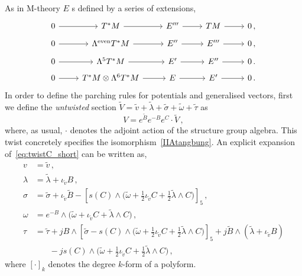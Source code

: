 \documentclass[debug]{phd}
\begin{document}
				As in M-theory $E$ s defined by a series of extensions,
							\begin{equation}\label{IIAexten}
								\begin{tikzcd}[row sep=tiny]
										0 \arrow{r} & T^*M \arrow{r} &E''' \arrow{r} &TM \arrow{r} &0 	\, , \\
										0 \arrow{r} &\Lambda^{\mathrm{even}} T^*M \arrow{r} &E'' \arrow{r} &E''' \arrow{r} &0 	\, , \\
										0 \arrow{r} &\Lambda^5 T^*M \arrow{r} &E' \arrow{r} &E'' \arrow{r} &0 \, . \\
										0 \arrow{r} &T^*M \otimes \Lambda^6 T^*M \arrow{r} &E \arrow{r} &E' \arrow{r} &0 \, .
									\end{tikzcd}
							\end{equation}
In order to define the parching rules for potentials and generalised vectors, first we define the \emph{untwisted} section $\tilde{V} = \tilde{v} + \tilde{\lambda} + \tilde{\sigma} + \tilde{\omega} + \tilde{\tau}$ as
							\begin{equation}\label{eq:twistC_short}
								V = e^{\tilde{B}} e^{-B} e^C \cdot \tilde{V} \, ,
							\end{equation}
					where, as usual, $\cdot$ denotes the adjoint action of the structure group algebra.
					This twist concretely specifies the isomorphism~\eqref{IIAtangbung}. An explicit expansion of~\eqref{eq:twistC_short} can be written as,
							\begin{equation}\label{eq:twistC}
								\begin{split}
									v 		&= \tilde{v}\, , \\[1.5mm]
									\lambda 	&= \tilde{\lambda} + \iota_{\tilde{v}} B\, , \\[1.5mm]
									\sigma 	&= \tilde{\sigma} + \iota_{\tilde{v}} \tilde{B} - \left[s(C) \wedge \big(\tilde{\omega} + \tfrac{1}{2} \iota_{\tilde{v}}C + \tfrac{1}{2}\tilde{\lambda} \wedge C \big)\right]_5 \, , \\[1.5mm]
									\omega 	&= e^{-B}\wedge \big( \tilde{\omega} + \iota_{\tilde{v}}C + \tilde{\lambda} \wedge C \big) \, , \\[1.5mm]
									\tau 		&= \tilde{\tau} + j B\wedge \left[\tilde{\sigma} - s(C)\wedge \big(\tilde{\omega} + \tfrac{1}{2} \iota_{\tilde{v}}C + \tfrac{1}{2}\tilde{\lambda} \wedge C \big)\right]_5 
												+ j\tilde{B} \wedge (\tilde{\lambda} + \iota_{\tilde{v}}B) \\
											&\phantom{=\tilde{\tau}} - j s(C)\wedge\big(\tilde{\omega} + \tfrac{1}{2}\iota_{\tilde{v}}C + \tfrac{1}{2} \tilde{\lambda} \wedge C \big) \, ,
								\end{split}
							\end{equation}
					where $[\cdot]_k$ denotes the degree $k$-form of a polyform.
\end{document}
